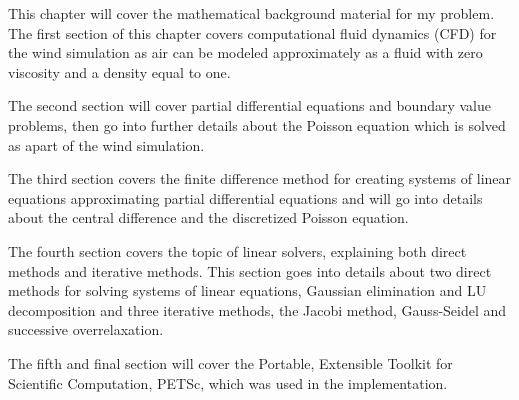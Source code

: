 This chapter will cover the mathematical background material for my problem. 
The first section of this chapter covers computational fluid dynamics (CFD) 
for the wind simulation as air can be modeled approximately as a fluid with 
zero viscosity and a density equal to one\cite{originalSnowThesis}.

The second section will cover partial differential equations and boundary value
problems, then go into further details about the Poisson equation which is 
solved as apart of the wind simulation.

The third section covers the finite difference method for creating systems of
linear equations approximating partial differential equations and will go into
details about the central difference and the discretized Poisson equation.

The fourth section covers the topic of linear solvers, explaining both direct
methods and iterative methods. This section goes into details about two direct
methods for solving systems of linear equations, Gaussian elimination and LU
decomposition and three iterative methods, the Jacobi method, Gauss-Seidel and
successive overrelaxation.

The fifth and final section will cover the Portable, Extensible Toolkit for
Scientific Computation, PETSc, which was used in the implementation.
